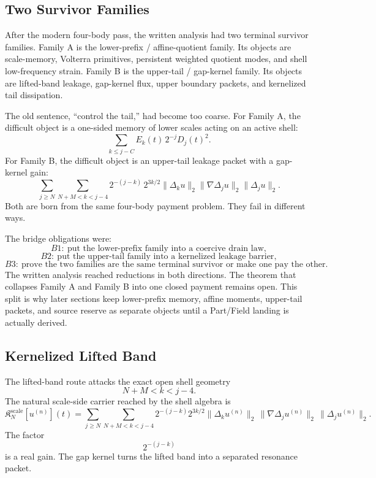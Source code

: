 \subsection{Two Survivor Families}

After the modern four-body pass, the written analysis had two terminal survivor families.
Family A is the lower-prefix / affine-quotient family.
Its objects are scale-memory, Volterra primitives, persistent weighted quotient
modes, and shell low-frequency strain.
Family B is the upper-tail / gap-kernel family.
Its objects are lifted-band leakage, gap-kernel flux, upper boundary packets,
and kernelized tail dissipation.

The old sentence, ``control the tail,'' had become too coarse.
For Family A, the difficult object is a one-sided memory of lower scales acting
on an active shell:
\[
  \sum_{k\le j-C} E_k(t)\,2^{-j}D_j(t)^2 .
\]
For Family B, the difficult object is an upper-tail leakage packet with a
gap-kernel gain:
\[
  \sum_{j\ge N}\sum_{N+M<k<j-4}
  2^{-(j-k)}\,2^{3k/2}\|\Delta_k u\|_2
  \|\nabla\Delta_j u\|_2\|\Delta_j u\|_2 .
\]
Both are born from the same four-body payment problem.
They fail in different ways.

The bridge obligations were:
\[
  B1:\ \text{put the lower-prefix family into a coercive drain law},
\]
\[
  B2:\ \text{put the upper-tail family into a kernelized leakage barrier},
\]
\[
  B3:\ \text{prove the two families are the same terminal survivor or make
  one pay the other}.
\]
The written analysis reached reductions in both directions.
The theorem that collapses Family A and Family B into one closed payment
remains open.
This split is why later sections keep lower-prefix memory, affine moments,
upper-tail packets, and source reserve as separate objects until a Part/Field landing
is actually derived.

\subsection{Kernelized Lifted Band}

The lifted-band route attacks the exact open shell geometry
\[
  N+M<k<j-4 .
\]
The natural scale-side carrier reached by the shell algebra is
\[
  \mathfrak K_N^{\mathrm{scale}}[u^{(n)}](t)
  =
  \sum_{j\ge N}\sum_{N+M<k<j-4}
  2^{-(j-k)}2^{3k/2}\|\Delta_k u^{(n)}\|_2\,
  \|\nabla\Delta_j u^{(n)}\|_2\,
  \|\Delta_j u^{(n)}\|_2 .
\]
The factor
\[
  2^{-(j-k)}
\]
is a real gain.
The gap kernel turns the lifted band into a separated resonance packet.


